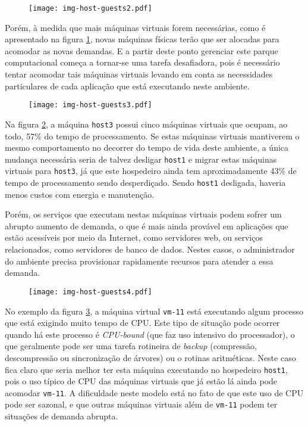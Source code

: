 \begin{figure}[htp]
\centering
\texttt{[image: img-host-guests2.pdf]}
\label{fig:hostguests2}
\end{figure}

Porém, à medida que mais máquinas virtuais forem necessárias, como é
apresentado na figura \ref{fig:hostguests2}, novas máquinas físicas terão
que ser alocadas para acomodar as novas demandas. E a partir deste ponto
gerenciar este parque computacional começa a tornar-se uma tarefa
desafiadora, pois é necessário tentar acomodar tais máquinas virtuais
levando em conta as necessidades particulares de cada aplicação que está
executando neste ambiente.

\begin{figure}[htp]
\centering
\texttt{[image: img-host-guests3.pdf]}
\label{fig:hostguests3}
\end{figure}

Na figura \ref{fig:hostguests3}, a máquina \texttt{host3} possui cinco máquinas
virtuais que ocupam, ao todo, 57\% do tempo de processamento. Se estas
máquinas virtuais mantiverem o mesmo comportamento no decorrer do tempo de
vida deste ambiente, a única mudança necessária seria de talvez desligar
\texttt{host1} e migrar estas máquinas virtuais para \texttt{host3}, já que
este hospedeiro ainda tem aproximadamente 43\% de tempo de processamento
sendo desperdiçado. Sendo \texttt{host1} desligada, haveria menos custos
com energia e manutenção.

Porém, os serviços que executam nestas máquinas virtuais podem sofrer um
abrupto aumento de demanda, o que é mais ainda provável em aplicações que
estão acessíveis por meio da Internet, como servidores web, ou serviços
relacionados, como servidores de banco de dados. Nestes casos, o
administrador do ambiente precisa provisionar rapidamente recursos para
atender a essa demanda.

\begin{figure}[htp]
\centering
\texttt{[image: img-host-guests4.pdf]}
\label{fig:hostguests4}
\end{figure}

No exemplo da figura \ref{fig:hostguests4}, a máquina virtual
\texttt{vm-11} está executando algum processo que está exigindo muito tempo
de CPU. Este tipo de situação pode ocorrer quando há este processo é
\emph{CPU-bound} (que faz uso intensivo do processador), o que geralmente
pode ser uma tarefa rotineira de \emph{backup} (compressão, descompressão ou
sincronização de árvores) ou o rotinas aritméticas. Neste caso fica claro que
seria melhor ter esta máquina executando no hospedeiro \texttt{host1}, pois o
uso típico de CPU das máquinas virtuais que já estão lá ainda pode acomodar
\texttt{vm-11}. A dificuldade neste modelo está no fato de que este uso de CPU
pode ser sazonal, e que outras máquinas virtuais além de \texttt{vm-11} podem
ter situações de demanda abrupta.

